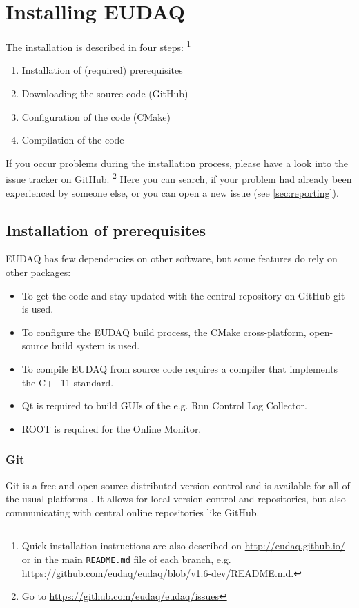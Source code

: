 \section{Installing EUDAQ}

The installation is described in four steps:%
\footnote{Quick installation instructions are also described on \url{http://eudaq.github.io/} or in the main \texttt{README.md} file of each branch, e.g. \url{https://github.com/eudaq/eudaq/blob/v1.6-dev/README.md}.}
\begin{enumerate}
\item Installation of (required) prerequisites
\item Downloading the source code (GitHub)
\item Configuration of the code (CMake)
\item Compilation of the code
\end{enumerate}

If you occur problems during the installation process, please have a look into the issue tracker on GitHub.%
\footnote{Go to \url{https://github.com/eudaq/eudaq/issues}} 
Here you can search, if your problem had already been experienced by someone else, or you can open a new issue (see \autoref{sec:reporting}).

\subsection{Installation of prerequisites}

EUDAQ has few dependencies on other software, but some features do rely on other packages:
\begin{itemize}
\item To get the code and stay updated with the central repository on GitHub git is used.
\item To configure the EUDAQ build process, the CMake cross-platform, open-source build system is used.
\item To compile EUDAQ from source code requires a compiler that implements the C++11 standard.
\item Qt is required to build GUIs of the e.g. Run Control Log Collector. 
\item ROOT is required for the Online Monitor.
\end{itemize}

\subsubsection{Git}
Git is a free and open source distributed version control and is available for all of the usual platforms \cite{gitWWW}. 
It allows for local version control and repositories, but also communicating with central online repositories like GitHub.
   
